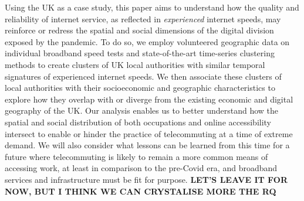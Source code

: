 \documentclass[]{interact}
\theoremstyle{plain}%
\theoremstyle{definition}
\theoremstyle{remark}
\begin{document}
Using the UK as a case study, this paper aims to understand how the
quality and reliability of internet service, as reflected in
\emph{experienced} internet speeds, may reinforce or redress the spatial
and social dimensions of the digital division exposed by the pandemic.
To do so, we employ volunteered geographic data on individual broadband
speed tests and state-of-the-art time-series clustering methods to
create clusters of UK local authorities with similar temporal signatures
of experienced internet speeds. We then associate these clusters of
local authorities with their socioeconomic and geographic
characteristics to explore how they overlap with or diverge from the
existing economic and digital geography of the UK. Our analysis enables
us to better understand how the spatial and social distribution of both
occupations and online accessibility intersect to enable or hinder the
practice of telecommuting at a time of extreme demand. We will also
consider what lessons can be learned from this time for a future where
telecommuting is likely to remain a more common means of accessing work,
at least in comparison to the pre-Covid era, and broadband services and
infrastructure must be fit for purpose. \textbf{LET'S LEAVE IT FOR NOW,
BUT I THINK WE CAN CRYSTALISE MORE THE RQ}
\end{document}
